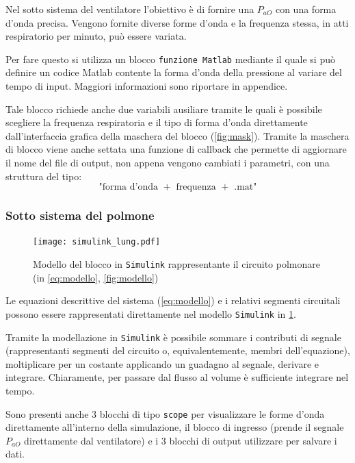Nel sotto sistema del ventilatore l'obiettivo è di fornire una $P_{aO}$ con una forma d'onda precisa. Vengono fornite diverse forme d'onda e la frequenza stessa, in atti respiratorio per minuto, può essere variata.

Per fare questo si utilizza un blocco \texttt{funzione Matlab} mediante il quale si può definire un codice Matlab contente la forma d'onda della pressione al variare del tempo di input. Maggiori informazioni sono riportare in appendice. 

Tale blocco richiede anche due variabili ausiliare tramite le quali è possibile scegliere la frequenza respiratoria e il tipo di forma d'onda direttamente dall'interfaccia grafica della maschera del blocco (\cref{fig:mask}). Tramite la maschera di blocco viene anche settata una funzione di callback che permette di aggiornare il nome del file di output, non appena vengono cambiati i parametri, con una struttura del tipo:
\begin{equation*}
	\text{"forma d'onda } + \text{ frequenza } + \text{ .mat"}
\end{equation*}


\subsubsection{Sotto sistema del polmone}


\begin{figure}[t!]
	\centering
	\texttt{[image: simulink\_lung.pdf]}
	\caption{Modello del blocco in  \texttt{Simulink} rappresentante il circuito polmonare (in \cref{eq:modello}, \cref{fig:modello})}
	\label{fig:simulinkLung}
\end{figure}

Le equazioni descrittive del sistema (\cref{eq:modello}) e i relativi segmenti circuitali possono essere rappresentati direttamente nel modello  \texttt{Simulink} in \cref{fig:simulinkLung}. 

Tramite la modellazione in  \texttt{Simulink} è possibile sommare i contributi di segnale (rappresentanti segmenti del circuito o, equivalentemente, membri dell'equazione), moltiplicare per un costante applicando un guadagno al segnale, derivare e integrare. 
Chiaramente, per passare dal flusso al volume è sufficiente integrare nel tempo. 

Sono presenti anche 3 blocchi di tipo \texttt{scope} per visualizzare le forme d'onda direttamente all'interno della simulazione, il blocco di ingresso (prende il segnale $P_{aO}$ direttamente dal ventilatore) e i 3 blocchi di output utilizzare per salvare i dati. 


